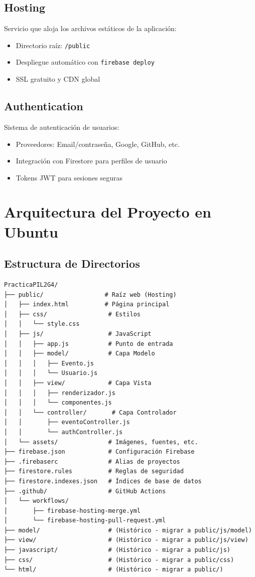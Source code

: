 \documentclass[12pt,a4paper]{article}
\begin{document}
\subsection{Hosting}
Servicio que aloja los archivos estáticos de la aplicación:
\begin{itemize}
    \item Directorio raíz: \texttt{/public}
    \item Despliegue automático con \texttt{firebase deploy}
    \item SSL gratuito y CDN global
\end{itemize}

\subsection{Authentication}
Sistema de autenticación de usuarios:
\begin{itemize}
    \item Proveedores: Email/contraseña, Google, GitHub, etc.
    \item Integración con Firestore para perfiles de usuario
    \item Tokens JWT para sesiones seguras
\end{itemize}

\section{Arquitectura del Proyecto en Ubuntu}

\subsection{Estructura de Directorios}
\begin{lstlisting}[frame=none, numbers=none]
PracticaPIL2G4/
├── public/                 # Raíz web (Hosting)
│   ├── index.html          # Página principal
│   ├── css/                 # Estilos
│   │   └── style.css
│   ├── js/                  # JavaScript
│   │   ├── app.js           # Punto de entrada
│   │   ├── model/           # Capa Modelo
│   │   │   ├── Evento.js
│   │   │   └── Usuario.js
│   │   ├── view/            # Capa Vista
│   │   │   ├── renderizador.js
│   │   │   └── componentes.js
│   │   └── controller/       # Capa Controlador
│   │       ├── eventoController.js
│   │       └── authController.js
│   └── assets/              # Imágenes, fuentes, etc.
├── firebase.json            # Configuración Firebase
├── .firebaserc              # Alias de proyectos
├── firestore.rules          # Reglas de seguridad
├── firestore.indexes.json   # Índices de base de datos
├── .github/                 # GitHub Actions
│   └── workflows/
│       ├── firebase-hosting-merge.yml
│       └── firebase-hosting-pull-request.yml
├── model/                   # (Histórico - migrar a public/js/model)
├── view/                    # (Histórico - migrar a public/js/view)
├── javascript/              # (Histórico - migrar a public/js)
├── css/                     # (Histórico - migrar a public/css)
└── html/                    # (Histórico - migrar a public/)
\end{lstlisting}
\end{document}
